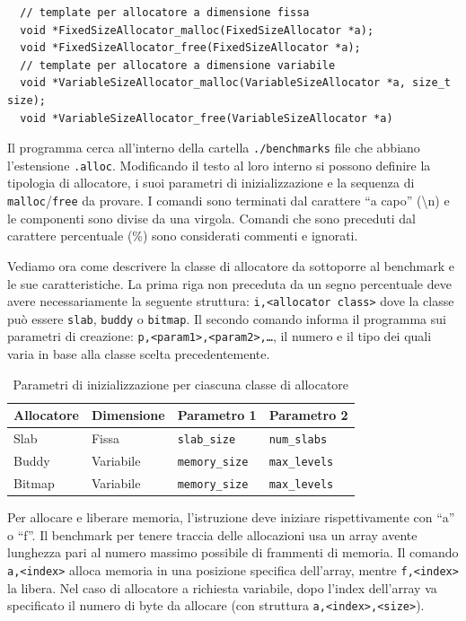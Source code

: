 \begin{lstlisting}
  // template per allocatore a dimensione fissa
  void *FixedSizeAllocator_malloc(FixedSizeAllocator *a);
  void *FixedSizeAllocator_free(FixedSizeAllocator *a);
  // template per allocatore a dimensione variabile
  void *VariableSizeAllocator_malloc(VariableSizeAllocator *a, size_t size);
  void *VariableSizeAllocator_free(VariableSizeAllocator *a)
\end{lstlisting}

Il programma cerca all’interno della cartella \texttt{./benchmarks} file che abbiano l’estensione \texttt{.alloc}. Modificando il testo al loro interno si possono definire la tipologia di allocatore, i suoi parametri di inizializzazione e la sequenza di \texttt{malloc}/\texttt{free} da provare. I comandi sono terminati dal carattere ``a capo'' (\textbackslash n) e le componenti sono divise da una virgola. Comandi che sono preceduti dal carattere percentuale (\%) sono considerati commenti e ignorati.

Vediamo ora come descrivere la classe di allocatore da sottoporre al benchmark e le sue caratteristiche. La prima riga non preceduta da un segno percentuale deve avere necessariamente la seguente struttura: \texttt{i,<allocator class>} dove la classe può essere \texttt{slab}, \texttt{buddy} o \texttt{bitmap}. Il secondo comando informa il programma sui parametri di creazione: \texttt{p,<param1>,<param2>,\ldots}, il numero e il tipo dei quali varia in base alla classe scelta precedentemente.

\begin{table}[H]
\centering
\begin{tabularx}{\textwidth}{|X|X|X|X|}
\hline
\textbf{Allocatore} & \textbf{Dimensione} & \textbf{Parametro 1} & \textbf{Parametro 2} \\
\hline
Slab    & Fissa     & \texttt{slab\_size}   & \texttt{num\_slabs}   \\
\hline
Buddy   & Variabile & \texttt{memory\_size} & \texttt{max\_levels}  \\
\hline
Bitmap  & Variabile & \texttt{memory\_size} & \texttt{max\_levels}  \\
\hline
\end{tabularx}
\caption{Parametri di inizializzazione per ciascuna classe di allocatore}
\end{table}

Per allocare e liberare memoria, l’istruzione deve iniziare rispettivamente con ``a'' o ``f''. Il benchmark per tenere traccia delle allocazioni usa un array avente lunghezza pari al numero massimo possibile di frammenti di memoria. Il comando \texttt{a,<index>} alloca memoria in una posizione specifica dell'array, mentre \texttt{f,<index>} la libera. Nel caso di allocatore a richiesta variabile, dopo l’index dell’array va specificato il numero di byte da allocare (con struttura \texttt{a,<index>,<size>}). 

